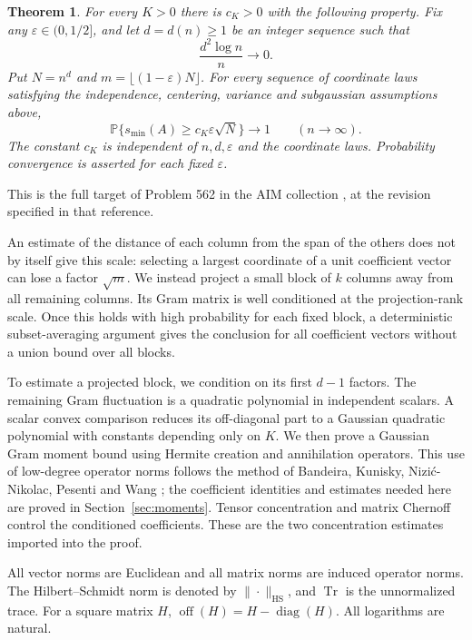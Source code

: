 \documentclass[11pt]{article}
\newtheorem{theorem}{Theorem}
\newcommand{\Prob}{\mathbb P}
\newcommand{\HS}{\mathrm{HS}}
\newcommand{\off}{\operatorname{off}}
\newcommand{\diag}{\operatorname{diag}}
\newcommand{\Tr}{\operatorname{Tr}}
\begin{document}
\begin{samepage}
\begin{theorem}\label{thm:main}
For every \(K>0\) there is \(c_K>0\) with the following property.
Fix any \(\varepsilon\in(0,1/2]\), and let \(d=d(n)\ge1\) be an integer
sequence such that
\[
 \frac{d^2\log n}{n}\longrightarrow0.
\]
Put \(N=n^d\) and \(m=\lfloor(1-\varepsilon)N\rfloor\).
For every sequence of coordinate laws satisfying the independence,
centering, variance and subgaussian assumptions above,
\[
 \Prob\{s_{\min}(A)\ge c_K\varepsilon\sqrt N\}
 \longrightarrow1\qquad(n\longrightarrow\infty).
\]
The constant \(c_K\) is independent of \(n,d,\varepsilon\) and the
coordinate laws. Probability convergence is asserted for each fixed
\(\varepsilon\).
\end{theorem}
\end{samepage}

This is the full target of Problem 562 in the AIM collection
\cite{AIM}, at the revision specified in that reference.

An estimate of the distance of each column from the span of the others
does not by itself give this scale: selecting a largest coordinate of a
unit coefficient vector can lose a factor \(\sqrt m\).
We instead project a small block of \(k\) columns away from all remaining
columns. Its Gram matrix is well conditioned at the projection-rank
scale. Once this holds with high probability for each fixed block,
a deterministic subset-averaging argument gives the conclusion for all
coefficient vectors without a union bound over all blocks.

To estimate a projected block, we condition on its first \(d-1\) factors.
The remaining Gram fluctuation is a quadratic polynomial in independent
scalars. A scalar convex comparison reduces its off-diagonal part to a
Gaussian quadratic polynomial with constants depending only on \(K\).
We then prove a Gaussian Gram moment bound using Hermite creation and
annihilation operators. This use of low-degree operator norms follows the
method of Bandeira, Kunisky, Nizi\'c-Nikolac, Pesenti and Wang
\cite[Section 2]{Fock}; the coefficient identities and estimates needed
here are proved in Section~\ref{sec:moments}. Tensor concentration
\cite{Vershynin} and matrix Chernoff \cite{Tropp} control the conditioned
coefficients. These are the two concentration estimates imported into
the proof.

All vector norms are Euclidean and all matrix norms are induced operator
norms. The Hilbert--Schmidt norm is denoted by \(\|\cdot\|_{\HS}\),
and \(\Tr\) is the unnormalized trace. For a square matrix \(H\),
\(\off(H)=H-\diag(H)\). All logarithms are natural.
\end{document}
